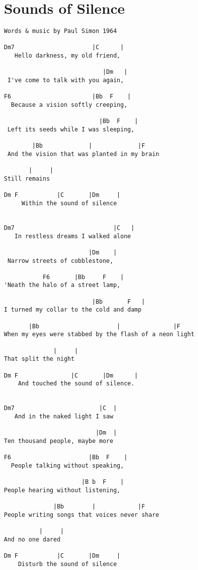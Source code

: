 \documentclass[leqno]{memoir}
\begin{document}
\chapter{Sounds of Silence}
\begin{verbatim}
Words & music by Paul Simon 1964

Dm7                      |C      |
   Hello darkness, my old friend,

                            |Dm   |
 I've come to talk with you again,

F6                       |Bb  F    |
  Because a vision softly creeping,

                           |Bb  F    |
 Left its seeds while I was sleeping,

        |Bb             |             |F
 And the vision that was planted in my brain

       |     |
Still remains

Dm F           |C       |Dm     |
     Within the sound of silence


Dm7                            |C   |
   In restless dreams I walked alone

                        |Dm    |
 Narrow streets of cobblestone,

           F6       |Bb     F    |
'Neath the halo of a street lamp,

                         |Bb       F   |
I turned my collar to the cold and damp

       |Bb                      |               |F
When my eyes were stabbed by the flash of a neon light

              |     |
That split the night

Dm F               |C       |Dm      |
    And touched the sound of silence.


Dm7                        |C  |
   And in the naked light I saw

                          |Dm  |
Ten thousand people, maybe more

F6                      |Bb  F    |
  People talking without speaking,

                      |B b  F    |
People hearing without listening,

              |Bb        |            |F
People writing songs that voices never share

          |     |
And no one dared

Dm F           |C       |Dm     |
    Disturb the sound of silence



\end{verbatim}
\end{document}
